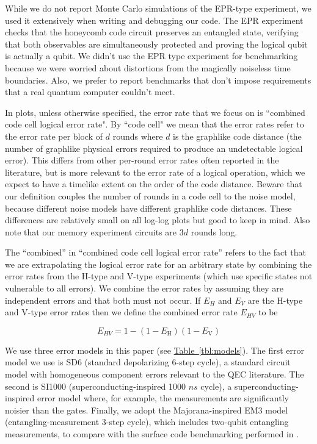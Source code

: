 \documentclass[onecolumn,unpublished,a4paper]{quantumarticle}
\theoremstyle{definition}
\theoremstyle{definition}
\theoremstyle{definition}
\newcommand{\tbl}[1]{\hyperref[tbl:#1]{Table~\ref*{tbl:#1}}}
\begin{document}
While we do not report Monte Carlo simulations of the EPR-type experiment, we used it extensively when writing and debugging our code.
The EPR experiment checks that the honeycomb code circuit preserves an entangled state, verifying that both observables are simultaneously protected and proving the logical qubit is actually a qubit.
We didn't use the EPR type experiment for benchmarking because we were worried about distortions from the magically noiseless time boundaries.
Also, we prefer to report benchmarks that don't impose requirements that a real quantum computer couldn't meet.

In plots, unless otherwise specified, the error rate that we focus on is ``combined code cell logical error rate".
By ``code cell" we mean that the error rates refer to the error rate per block of $d$ rounds where $d$ is the graphlike code distance (the number of graphlike physical errors required to produce an undetectable logical error).
This differs from other per-round error rates often reported in the literature, but is more relevant to the error rate of a logical operation, which we expect to have a timelike extent on the order of the code distance.  
Beware that our definition couples the number of rounds in a code cell to the noise model, because different noise models have different graphlike code distances.
These differences are relatively small on all log-log plots but good to keep in mind.
Also note that our memory experiment circuits are $3d$ rounds long.

The ``combined'' in ``combined code cell logical error rate'' refers to the fact that we are extrapolating the logical error rate for an arbitrary state by combining the error rates from the H-type and V-type experiments (which use specific states not vulnerable to all errors).
We combine the error rates by assuming they are independent errors and that both must not occur.
If $E_H$ and $E_V$ are the H-type and V-type error rates then we define the combined error rate $E_{HV}$ to be

\begin{equation}
    E_{HV} = 1 - (1 - E_{\text{H}}) (1 -  E_{\text{V}})
    \label{eq:combined_logical_error}
\end{equation}

We use three error models in this paper (see \tbl{models}).
The first error model we use is SD6 (standard depolarizing 6-step cycle), a standard circuit model with homogeneous component errors relevant to the QEC literature.
The second is SI1000 (superconducting-inspired 1000 $ns$ cycle), a superconducting-inspired error model where, for example, the measurements are significantly noisier than the gates.  
Finally, we adopt the Majorana-inspired EM3 model (entangling-measurement 3-step cycle), which includes two-qubit entangling measurements, to compare with the surface code benchmarking performed in \cite{chao2020optimization}.
\end{document}
